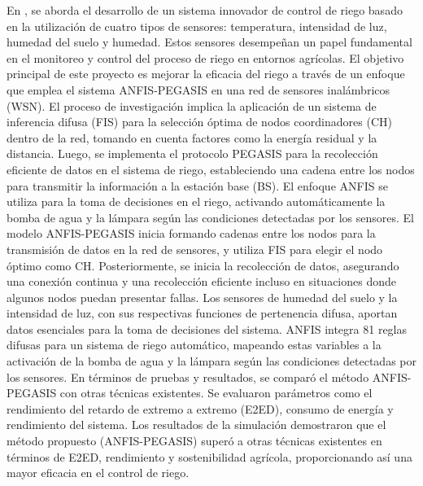 \bigbreak
En \cite{kumar_irrigation_2020}, se aborda el desarrollo de un sistema innovador de control de riego basado en la utilización de cuatro tipos de sensores: temperatura, intensidad de luz, humedad del suelo y humedad. Estos sensores desempeñan un papel fundamental en el monitoreo y control del proceso de riego en entornos agrícolas. El objetivo principal de este proyecto es mejorar la eficacia del riego a través de un enfoque que emplea el sistema ANFIS-PEGASIS en una red de sensores inalámbricos (WSN). El proceso de investigación implica la aplicación de un sistema de inferencia difusa (FIS) para la selección óptima de nodos coordinadores (CH) dentro de la red, tomando en cuenta factores como la energía residual y la distancia. Luego, se implementa el protocolo PEGASIS para la recolección eficiente de datos en el sistema de riego, estableciendo una cadena entre los nodos para transmitir la información a la estación base (BS). El enfoque ANFIS se utiliza para la toma de decisiones en el riego, activando automáticamente la bomba de agua y la lámpara según las condiciones detectadas por los sensores. El modelo ANFIS-PEGASIS inicia formando cadenas entre los nodos para la transmisión de datos en la red de sensores, y utiliza FIS para elegir el nodo óptimo como CH. Posteriormente, se inicia la recolección de datos, asegurando una conexión continua y una recolección eficiente incluso en situaciones donde algunos nodos puedan presentar fallas. Los sensores de humedad del suelo y la intensidad de luz, con sus respectivas funciones de pertenencia difusa, aportan datos esenciales para la toma de decisiones del sistema. ANFIS integra 81 reglas difusas para un sistema de riego automático, mapeando estas variables a la activación de la bomba de agua y la lámpara según las condiciones detectadas por los sensores. En términos de pruebas y resultados, se comparó el método ANFIS-PEGASIS con otras técnicas existentes. Se evaluaron parámetros como el rendimiento del retardo de extremo a extremo (E2ED), consumo de energía y rendimiento del sistema. Los resultados de la simulación demostraron que el método propuesto (ANFIS-PEGASIS) superó a otras técnicas existentes en términos de E2ED, rendimiento y sostenibilidad agrícola, proporcionando así una mayor eficacia en el control de riego.

